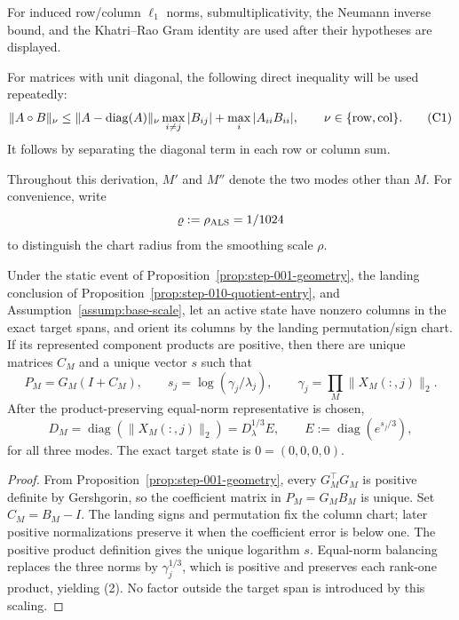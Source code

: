 For induced row/column $\ell_1$ norms, submultiplicativity, the Neumann inverse bound, and the Khatri--Rao Gram identity are used after their hypotheses are displayed.

For matrices with unit diagonal, the following direct inequality will be
   used repeatedly:
   \[
   \|A\circ B\|_\nu
   \le \|A-\operatorname{diag}(A)\|_\nu
      \max_{i\ne j}|B_{ij}|
   +\max_i|A_{ii}B_{ii}|,
   \qquad \nu\in\{{\rm row},{\rm col}\}.
   \tag{C1}
   \]
   It follows by separating the diagonal term in each row or column sum.

Throughout this derivation, \(M'\) and \(M''\) denote the two modes other
than \(M\). For convenience, write
\[
\varrho:=\rho_{\rm ALS}=1/1024
\]
to distinguish the chart radius from the smoothing scale $\rho$.


\begin{lemma}\label{lem:step-011-quotient-chart}
Under the static event of Proposition~\ref{prop:step-001-geometry}, the
landing conclusion of Proposition~\ref{prop:step-010-quotient-entry}, and
Assumption~\ref{assump:base-scale}, let an active state have nonzero columns in the exact
target spans, and orient its columns by the landing permutation/sign chart.
If its represented component products are positive, then there are unique
matrices \(C_M\) and a unique vector \(s\) such that
\[
 P_M=G_M(I+C_M),\qquad
 s_j=\log(\gamma_j/\lambda_j),
 \qquad \gamma_j=\prod_M\|X_M(:,j)\|_2.
 \tag{1}
\]
After the product-preserving equal-norm representative is chosen,
\[
 D_M=\operatorname{diag}(\|X_M(:,j)\|_2)
  =D_\lambda^{1/3}E,
 \qquad E:=\operatorname{diag}(e^{s_j/3}),
 \tag{2}
\]
for all three modes. The exact target state is \(0=(0,0,0,0)\).

\begin{proof}
From Proposition~\ref{prop:step-001-geometry}, every \(G_M^\top G_M\) is positive
definite by Gershgorin, so the coefficient matrix in
\(P_M=G_MB_M\) is unique. Set \(C_M=B_M-I\). The landing signs and
permutation fix the column chart; later positive normalizations preserve it
when the coefficient error is below one. The positive product definition
gives the unique logarithm \(s\). Equal-norm balancing replaces the three
norms by \(\gamma_j^{1/3}\), which is positive and preserves each rank-one
product, yielding (2). No factor outside the target span is introduced by
this scaling.


\end{proof}
\end{lemma}
